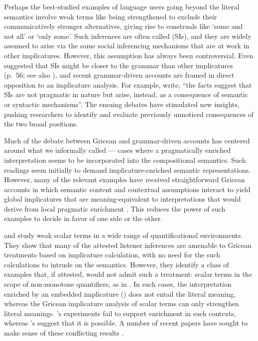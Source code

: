 \documentclass[leqno,12pt]{article}
\begin{document}
Perhaps the best-studied examples of language users going beyond the
literal semantics involve weak terms like  being
strengthened to exclude their communicatively stronger alternatives,
giving rise to construals like `some and not all' or `only some'.
Such inferences are often called  (SIs), and they are widely assumed to arise via the
same social inferencing mechanisms that are at work in other
implicatures.  However, this assumption has always been
controversial. Even \citeauthor{Grice75} suggested that SIs might be
closer to the grammar than other implicatures (p.~56; see also
\citealt{Levinson00,Sperber95,Bach06}), and recent grammar-driven
accounts are framed in direct opposition to an implicature analysis.
For example,  write, ``the facts
suggest that SIs are not pragmatic in nature but arise, instead, as a
consequence of semantic or syntactic mechanisms''. The ensuing debates
have stimulated new insights, pushing researchers to identify and
evaluate previously unnoticed consequences of the two broad positions.

Much of the debate between Gricean and grammar-driven accounts has
centered around what we informally called 
--- cases where a pragmatically enriched interpretation seems to be
incorporated into the compositional semantics. Such readings seem
initially to demand implicature-enriched semantic representations.
However, many of the relevant examples have received straightforward
Gricean accounts in which semantic content and contextual assumptions
interact to yield global implicatures that are meaning-equivalent to
interpretations that would derive from local pragmatic enrichment
\citep{Russell06,Geurts09}. This reduces the power of such examples to
decide in favor of one side or the other.


\citet{Geurts:Pouscoulous:2009} and \citet{Chemla:Spector:2011} study
weak scalar terms in a wide range of quantificational environments.
They show that many of the attested listener inferences are amenable
to Gricean treatments based on implicature calculation, with no need
for the such calculations to intrude on the semantics. However, they
identify a class of examples that, if attested, would not admit such a
treatment: scalar terms in the scope of non-monotone quantifiers, as
in . In such cases, the
interpretation enriched by an embedded implicature () does not entail the literal meaning,
whereas the Gricean implicature analysis of scalar terms can only
strengthen literal meanings. \citeauthor{Geurts:Pouscoulous:2009}'s
experiments fail to support enrichment in such contexts, whereas
\citeauthor{Chemla:Spector:2011}'s suggest that it is possible. A
number of recent papers have sought to make sense of these conflicting
results \citep{Clifton:Dube:2010,geurts-vantiel:2013:scalar,vanTiel:2014}.
\end{document}

